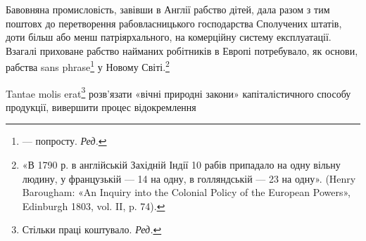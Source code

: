 Бавовняна промисловість, завівши в Англії рабство дітей,
дала разом з тим поштовх до перетворення рабовласницького
господарства Сполучених штатів, доти більш або менш патріярхального,
на комерційну систему експлуатації. Взагалі приховане
рабство найманих робітників в Европі потребувало, як основи,
рабства sans phrase\footnote*{
— попросту. \emph{Ред.}
} у Новому Світі.\footnote{
«В 1790 р. в англійській Західній Індії 10 рабів припадало на
одну вільну людину, у французькій — 14 на одну, в голляндській — 23
на одну». (Henry Barougham: «An Inquiry into the Colonial Policy of
the European Powers», Edinburgh 1803, vol. II, p. 74).
}

Tantae molis erat\footnote*{
Стільки праці коштувало. \emph{Ред.}
} розв’язати «вічні природні закони»
капіталістичного способу продукції, вивершити процес відокремлення

